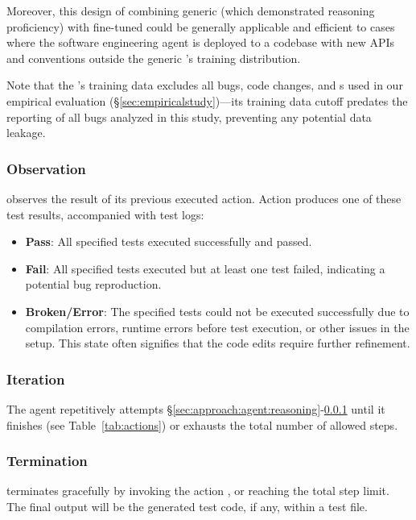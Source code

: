 Moreover, this design of combining generic \llm (which demonstrated reasoning proficiency) with fine-tuned \codeeditingllm could be generally applicable and efficient to cases where the software engineering agent is deployed to a codebase with new APIs and conventions outside the generic \llm's training distribution.

Note that the \codeeditingllm's training data excludes all bugs, code changes, and \brt{}s used in our empirical evaluation (\S\ref{sec:empiricalstudy})---its training data cutoff predates the reporting of all bugs analyzed in this study, preventing any potential data leakage.



\subsubsection{Observation}
\label{sec:approach:agent:observe}
\tool observes the result of its previous executed action. 
Action \actiontest produces one of these test results, accompanied with test logs: 
    \begin{itemize}
        \item \textbf{Pass}: All specified tests executed successfully and passed.
        \item \textbf{Fail}: All specified tests executed but at least one test failed, indicating a potential bug reproduction.
        \item \textbf{Broken/Error}: The specified tests could not be executed successfully due to compilation errors, runtime errors before test execution, or other issues in the setup. This state often signifies that the code edits require further refinement.
    \end{itemize}


\subsubsection{Iteration}
\label{sec:approach:agent:iterate}
The agent repetitively attempts \S\ref{sec:approach:agent:reasoning}-\ref{sec:approach:agent:observe} until it finishes (see Table~\ref{tab:actions}) or exhausts the total number of allowed steps.

\subsubsection{Termination}
\label{sec:approach:agent:terminate}
\tool terminates gracefully by invoking the action \actionfinish, or reaching the total step limit. 
The final output will be the generated test code, if any, within a test file.






































